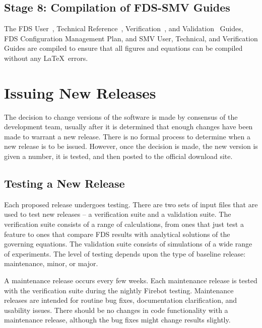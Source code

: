 \documentclass[11pt]{book}
\begin{document}
\subsection*{Stage 8: Compilation of FDS-SMV Guides}

The FDS User~\cite{FDS_Users_Guide}, Technical Reference~\cite{FDS_Math_Guide}, Verification~\cite{FDS_Verification_Guide}, and Validation~\cite{FDS_Validation_Guide} Guides, FDS Configuration Management Plan, and SMV User, Technical, and Verification Guides are compiled to ensure that all figures and equations can be compiled without any \LaTeX\ errors.


\section{Issuing New Releases}

The decision to change versions of the software is made by consensus of the development team, usually after it is determined that enough changes have been made to warrant a new release. There is no formal process to determine when a new release is to be issued. However, once the decision is made, the new version is given a number, it is tested, and then posted to the official download site.


\subsection{Testing a New Release}

Each proposed release undergoes testing. There are two sets of input files that are used to test new releases -- a verification suite and a validation suite. The verification suite consists of a range of calculations, from ones that just test a feature to ones that compare FDS results with analytical solutions of the governing equations. The validation suite consists of simulations of a wide range of experiments. The level of testing depends upon the type of baseline release: maintenance, minor, or major.

A maintenance release occurs every few weeks. Each maintenance release is tested with the verification suite during the nightly Firebot testing. Maintenance releases are intended for routine bug fixes, documentation clarification, and usability issues. There should be no changes in code functionality with a maintenance release, although the bug fixes might change results slightly.
\end{document}
